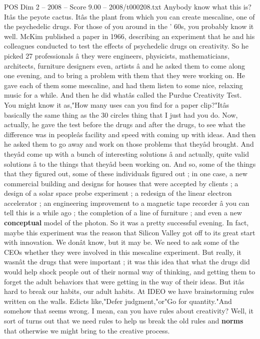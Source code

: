 \begin{textsample}{POS Dim 2 – 2008 – Score 9.00 – 2008/t000208.txt}
Anybody know what this is?
Itâs the peyote cactus.
Itâs the plant from which you can create mescaline, one of the psychedelic drugs.
For those of you around in the ' 60s, you probably know it well.
McKim published a paper in 1966, describing an experiment that he and his colleagues conducted to test the effects of psychedelic drugs on creativity.
So he picked 27 professionals â they were engineers, physicists, mathematicians, architects, furniture designers even, artists â and he asked them to come along one evening, and to bring a problem with them that they were working on.
He gave each of them some mescaline, and had them listen to some nice, relaxing music for a while.
And then he did whatâs called the Purdue Creativity Test.
You might know it as,"How many uses can you find for a paper clip?"Itâs basically the same thing as the 30 circles thing that I just had you do.
Now, actually, he gave the test before the drugs and after the drugs, to see what the difference was in peopleâs facility and speed with coming up with ideas.
And then he asked them to go away and work on those problems that theyâd brought.
And theyâd come up with a bunch of interesting solutions â and actually, quite valid solutions â to the things that theyâd been working on.
And so, some of the things that they figured out, some of these individuals figured out ; in one case, a new commercial building and designs for houses that were accepted by clients ; a design of a solar space probe experiment ; a redesign of the linear electron accelerator ; an engineering improvement to a magnetic tape recorder â you can tell this is a while ago ; the completion of a line of furniture ; and even a new \textbf{conceptual} model of the photon.
So it was a pretty successful evening.
In fact, maybe this experiment was the reason that Silicon Valley got off to its great start with innovation.
We donât know, but it may be.
We need to ask some of the CEOs whether they were involved in this mescaline experiment.
But really, it wasnât the drugs that were important ; it was this idea that what the drugs did would help shock people out of their normal way of thinking, and getting them to forget the adult behaviors that were getting in the way of their ideas.
But itâs hard to break our habits, our adult habits.
At IDEO we have brainstorming rules written on the walls.
Edicts like,"Defer judgment,"or"Go for quantity."And somehow that seems wrong.
I mean, can you have rules about creativity?
Well, it sort of turns out that we need rules to help us break the old rules and \textbf{norms} that otherwise we might bring to the creative process.

\end{textsample}
